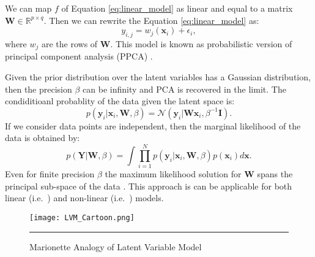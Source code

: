 We can map $f$ of Equation \ref{eq:linear_model} as linear and equal to a matrix 
$\textbf{W}\in\mathbb{R}^{p\times q}$. Then we can rewrite the Equation \ref{eq:linear_model} as:
\begin{equation} \label{eq:linear_model_matrix}
y_{i,j} = w_j\left(\textbf{x}_{i}\right) + \epsilon_{i},
\end{equation}
where $w_j$ are the rows of $\textbf{W}$. This model is known as probabilistic version of principal 
component analysis (PPCA) \cite{Roweis:1998, Tipping:1999}. 

Given the prior distribution over the latent variables has a Gaussian distribution, then the 
precision $\beta$ can be infinity and PCA is recovered in the limit. The condiditioanl probablity
of the data given the latent space is:
\begin{equation} \label{eq:cond_prob_latent_space}
p\left(\textbf{y}_i|\textbf{x}_i,\textbf{W},\beta \right) = \mathcal{N} \left(\textbf{y}_i|\textbf{W}\textbf{x}_i,\beta^{-1}\textbf{I}\right).
\end{equation}
If we consider data points are independent, then the marginal likelihood of the data is obtained by:
\begin{equation} \label{eq:marginal_likelihood_latent_space}
p\left(\textbf{Y}|\textbf{W},\beta \right) = 
\int \prod^{N}_{i=1} p\left(\textbf{y}_i|\textbf{x}_i,\textbf{W},\beta\right)p\left(\textbf{x}_i\right)d\textbf{x}.
\end{equation}
Even for finite precision $\beta$ the maximum likelihood solution for $\textbf{W}$ spans the 
principal sub-space of the data \cite{Tipping:1999}. This approach is can be applicable for both 
linear (i.e.\ \cite{Sanguinetti:2006}) and non-linear (i.e.\ \cite{Lawrence:2005}) models.  

\begin{figure}
	\centering
		\texttt{[image: LVM\_Cartoon.png]}
		\rule{35em}{0.5pt}
	\caption[Marionette Analogy of Latent Variable Model]
		{Marionette Analogy of Latent Variable Model}
	\label{fig:LVM Cartton}
\end{figure}



